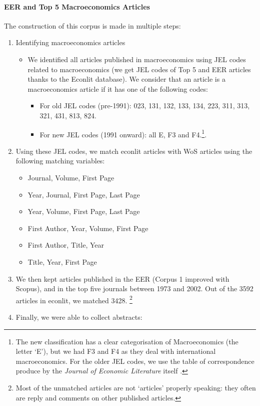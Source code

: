 \documentclass[]{elsarticle} %
\providecommand{\tightlist}{%
  \setlength{\itemsep}{0pt}\setlength{\parskip}{0pt}}
\begin{document}
\hypertarget{eer-top5-macro}{%
\paragraph*{EER and Top 5 Macroeconomics
Articles}\label{eer-top5-macro}}

The construction of this corpus is made in multiple steps:

\begin{enumerate}
\def\labelenumi{\arabic{enumi}.}
\item
  Identifying macroeconomics articles

  \begin{itemize}
  \item
    We identified all articles published in macroeconomics using JEL
    codes related to macroeconomics (we get JEL codes of Top 5 and EER
    articles thanks to the Econlit database). We consider that an
    article is a macroeconomics article if it has one of the following
    codes:

    \begin{itemize}
    \tightlist
    \item
      For old JEL codes (pre-1991): 023, 131, 132, 133, 134, 223, 311,
      313, 321, 431, 813, 824.
    \item
      For new JEL codes (1991 onward): all E, F3 and F4.\footnote{The
        new classification has a clear categorisation of Macroeconomics
        (the letter `E'), but we had F3 and F4 as they deal with
        international macroeconomics. For the older JEL codes, we use
        the table of correspondence produce by the \emph{Journal of
        Economic Literature} itself \citep{jel1991}.}.
    \end{itemize}
  \end{itemize}
\item
  Using these JEL codes, we match econlit articles with WoS articles
  using the following matching variables:

  \begin{itemize}
  \tightlist
  \item
    Journal, Volume, First Page
  \item
    Year, Journal, First Page, Last Page
  \item
    Year, Volume, First Page, Last Page
  \item
    First Author, Year, Volume, First Page
  \item
    First Author, Title, Year
  \item
    Title, Year, First Page
  \end{itemize}
\item
  We then kept articles published in the EER (Corpus 1 improved with
  Scopus), and in the top five journals between 1973 and 2002. Out of
  the 3592 articles in econlit, we matched 3428. \footnote{Most of the
    unmatched articles are not `articles' properly speaking: they often
    are reply and comments on other published articles.}
\item
  Finally, we were able to collect abstracts:


\end{enumerate}
\end{document}
